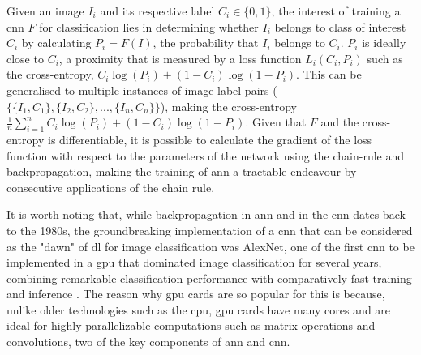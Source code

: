 Given an image $I_i$ and its respective label $C_i \in \{0,1\}$, the interest of training a \ac{cnn} $F$ for classification lies in determining whether $I_i$ belongs to class of interest $C_i$ by calculating $P_i = F(I)$, the probability that $I_i$ belongs to $C_i$. $P_i$ is ideally close to $C_i$, a proximity that is measured by a loss function $L_i(C_i,P_i)$ such as the cross-entropy, $C_i\log(P_i) + (1-C_i)\log(1-P_i)$. This can be generalised to multiple instances of image-label pairs ($\{\{I_1,C_1\},\{I_2,C_2\},...,\{I_n,C_n\}\}$), making the cross-entropy $\frac{1}{n}\sum_{i=1}^{n}C_i\log(P_i) + (1-C_i)\log(1-P_i)$. Given that $F$ and the cross-entropy is differentiable, it is possible to calculate the gradient of the loss function with respect to the parameters of the network using the chain-rule and backpropagation, making the training of \ac{ann} a tractable endeavour by consecutive applications of the chain rule. 

It is worth noting that, while backpropagation in \ac{ann} and in the \ac{cnn} dates back to the 1980s, the groundbreaking implementation of a \ac{cnn} that can be considered as the "dawn" of \ac{dl} for image classification was AlexNet, one of the first \ac{cnn} to be implemented in a \ac{gpu} that dominated image classification for several years, combining remarkable classification performance with comparatively fast training and inference \cite{Krizhevsky2012-by}. The reason why \ac{gpu} cards are so popular for this is because, unlike older technologies such as the \ac{cpu}, \ac{gpu} cards have many cores and are ideal for highly parallelizable computations such as matrix operations and convolutions, two of the key components of \ac{ann} and \ac{cnn}.

